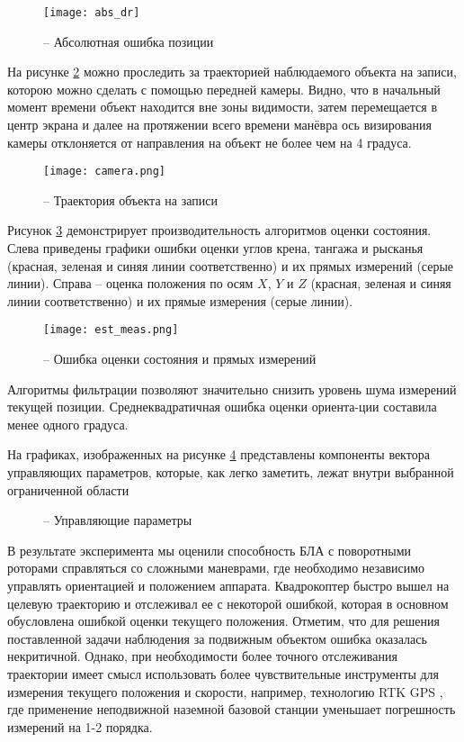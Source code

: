 \begin{figure}[h!]
	\centering
	\texttt{[image: abs\_dr]}
	\caption{ -- Абсолютная ошибка позиции}
	\label{fig:mau_abs_dr}
\end{figure}

На рисунке \ref{fig:mau_cam} можно проследить за траекторией наблюдаемого объекта на записи, которою можно сделать с помощью передней камеры.
Видно, что в начальный момент времени объект находится вне зоны видимости, затем перемещается в центр экрана и далее на протяжении всего времени манёвра ось визирования камеры отклоняется от направления на объект не более чем на 4 градуса.
\begin{figure}[h!]
	\centering
	\texttt{[image: camera.png]}
	\caption{ -- Траектория объекта на записи}
	\label{fig:mau_cam}
\end{figure}

Рисунок \ref{fig:mau_est} демонстрирует производительность алгоритмов оценки состояния. Слева приведены графики ошибки оценки углов крена, тангажа и рысканья (красная, зеленая и синяя линии соответственно) и их прямых измерений (серые линии). Справа – оценка положения по осям $X$, $Y$ и $Z$ (красная, зеленая и синяя линии соответственно) и их прямые измерения (серые линии).
\begin{figure}[h!]
	\centering
	\texttt{[image: est\_meas.png]}
	\caption{ -- Ошибка оценки состояния и прямых измерений}
	\label{fig:mau_est}
\end{figure}
Алгоритмы фильтрации позволяют значительно снизить уровень шума измерений текущей позиции. Среднеквадратичная ошибка оценки ориента-ции составила менее одного градуса.

На графиках, изображенных на рисунке \ref{fig:mau_ctrl_out} представлены компоненты вектора управляющих параметров, которые, как легко заметить, лежат внутри выбранной ограниченной области

\begin{figure}[h!]
	
	
	
	\caption{ -- Управляющие параметры}
	\label{fig:mau_ctrl_out}
	
\end{figure}

В результате эксперимента мы оценили способность БЛА с поворотными роторами справляться со сложными маневрами, где необходимо независимо управлять ориентацией и положением аппарата. Квадрокоптер быстро вышел на целевую траекторию и отслеживал ее с некоторой ошибкой, которая в основном обусловлена ошибкой оценки текущего положения.
Отметим, что для решения поставленной задачи наблюдения за подвижным объектом ошибка оказалась некритичной. 
Однако, при необходимости более точного отслеживания траектории имеет смысл использовать более чувствительные инструменты для измерения текущего положения и скорости, например, технологию RTK GPS \cite{Feng01}, где применение неподвижной наземной базовой станции уменьшает погрешность измерений на 1-2 порядка.


